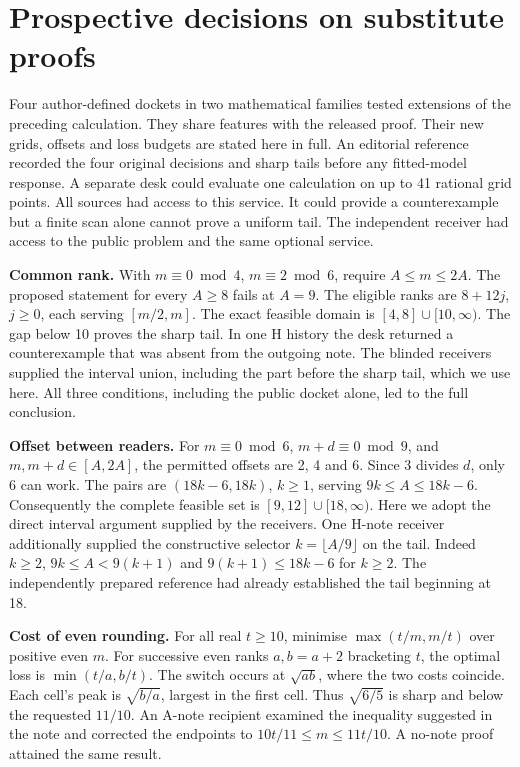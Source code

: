 \documentclass[11pt,a4paper]{article}
\newcommand{\lead}[1]{\textbf{#1}\enspace}
\begin{document}
\section{Prospective decisions on substitute proofs}\label{sec:handoff}
Four author-defined dockets in two mathematical families tested extensions of the preceding calculation. They share features with the released proof. Their new grids, offsets and loss budgets are stated here in full. An editorial reference recorded the four original decisions and sharp tails before any fitted-model response. A separate desk could evaluate one calculation on up to 41 rational grid points. All sources had access to this service. It could provide a counterexample but a finite scan alone cannot prove a uniform tail. The independent receiver had access to the public problem and the same optional service.

\lead{Common rank.} With \(m\equiv0\bmod4\), \(m\equiv2\bmod6\), require \(A\leq m\leq2A\). The proposed statement for every \(A\geq8\) fails at \(A=9\). The eligible ranks are \(8+12j\), \(j\geq0\), each serving \([m/2,m]\). The exact feasible domain is \([4,8]\cup[10,\infty)\). The gap below 10 proves the sharp tail. In one H history the desk returned a counterexample that was absent from the outgoing note. The blinded receivers supplied the interval union, including the part before the sharp tail, which we use here. All three conditions, including the public docket alone, led to the full conclusion.

\lead{Offset between readers.} For \(m\equiv0\bmod6\), \(m+d\equiv0\bmod9\), and \(m,m+d\in[A,2A]\), the permitted offsets are 2, 4 and 6. Since 3 divides \(d\), only 6 can work. The pairs are \((18k-6,18k)\), \(k\geq1\), serving \(9k\leq A\leq18k-6\). Consequently the complete feasible set is \([9,12]\cup[18,\infty)\). Here we adopt the direct interval argument supplied by the receivers. One H-note receiver additionally supplied the constructive selector \(k=\lfloor A/9\rfloor\) on the tail. Indeed \(k\geq2\), \(9k\leq A<9(k+1)\) and \(9(k+1)\leq18k-6\) for \(k\geq2\). The independently prepared reference had already established the tail beginning at 18.

\lead{Cost of even rounding.} For all real \(t\geq10\), minimise \(\max(t/m,m/t)\) over positive even \(m\). For successive even ranks \(a,b=a+2\) bracketing \(t\), the optimal loss is \(\min(t/a,b/t)\). The switch occurs at \(\sqrt{ab}\), where the two costs coincide. Each cell's peak is \(\sqrt{b/a}\), largest in the first cell. Thus \(\sqrt{6/5}\) is sharp and below the requested \(11/10\). An A-note recipient examined the inequality suggested in the note and corrected the endpoints to \(10t/11\leq m\leq11t/10\). A no-note proof attained the same result.
\end{document}
